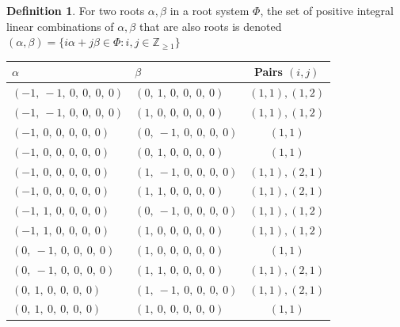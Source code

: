 \documentclass[11pt]{article}
\theoremstyle{definition}
\newtheorem{definition}{Definition}[section]
\begin{document}
\begin{definition}
For two roots $\alpha, \beta$ in a root system $\Phi$, the set of positive integral linear combinations of $\alpha, \beta$ that are also roots is denoted
\(
	(\alpha, \beta) = \{ i \alpha + j \beta \in \Phi : i, j \in \mathbb{Z}_{\ge 1} \}
\)
\end{definition}

\begin{center}
\begin{tabular}{|l|l|c|}
    \hline
    $\alpha$ & $\beta$ & Pairs $(i,j)$ \\
    \hline
    $\left( -1, \  -1, \  0, \  0, \  0, \  0\right)$ & $\left( 0, \  1, \  0, \  0, \  0, \  0\right)$ & $(1,1), (1,2)$ \\
    \hline
    $\left( -1, \  -1, \  0, \  0, \  0, \  0\right)$ & $\left( 1, \  0, \  0, \  0, \  0, \  0\right)$ & $(1,1), (1,2)$ \\
    \hline
    $\left( -1, \  0, \  0, \  0, \  0, \  0\right)$ & $\left( 0, \  -1, \  0, \  0, \  0, \  0\right)$ & $(1,1)$ \\
    \hline
    $\left( -1, \  0, \  0, \  0, \  0, \  0\right)$ & $\left( 0, \  1, \  0, \  0, \  0, \  0\right)$ & $(1,1)$ \\
    \hline
    $\left( -1, \  0, \  0, \  0, \  0, \  0\right)$ & $\left( 1, \  -1, \  0, \  0, \  0, \  0\right)$ & $(1,1), (2,1)$ \\
    \hline
    $\left( -1, \  0, \  0, \  0, \  0, \  0\right)$ & $\left( 1, \  1, \  0, \  0, \  0, \  0\right)$ & $(1,1), (2,1)$ \\
    \hline
    $\left( -1, \  1, \  0, \  0, \  0, \  0\right)$ & $\left( 0, \  -1, \  0, \  0, \  0, \  0\right)$ & $(1,1), (1,2)$ \\
    \hline
    $\left( -1, \  1, \  0, \  0, \  0, \  0\right)$ & $\left( 1, \  0, \  0, \  0, \  0, \  0\right)$ & $(1,1), (1,2)$ \\
    \hline
    $\left( 0, \  -1, \  0, \  0, \  0, \  0\right)$ & $\left( 1, \  0, \  0, \  0, \  0, \  0\right)$ & $(1,1)$ \\
    \hline
    $\left( 0, \  -1, \  0, \  0, \  0, \  0\right)$ & $\left( 1, \  1, \  0, \  0, \  0, \  0\right)$ & $(1,1), (2,1)$ \\
    \hline
    $\left( 0, \  1, \  0, \  0, \  0, \  0\right)$ & $\left( 1, \  -1, \  0, \  0, \  0, \  0\right)$ & $(1,1), (2,1)$ \\
    \hline
    $\left( 0, \  1, \  0, \  0, \  0, \  0\right)$ & $\left( 1, \  0, \  0, \  0, \  0, \  0\right)$ & $(1,1)$ \\
    \hline
\end{tabular}
\end{center}
\end{document}
